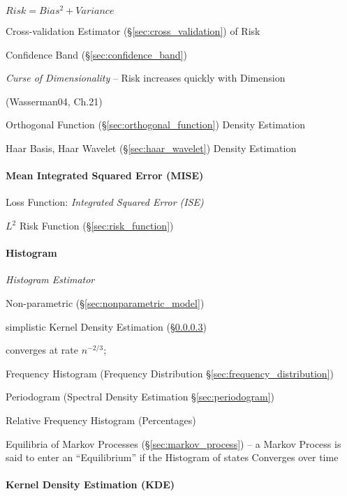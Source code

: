 $Risk = Bias^2 + Variance$

Cross-validation Estimator (\S\ref{sec:cross_validation}) of Risk

Confidence Band (\S\ref{sec:confidence_band})

\emph{Curse of Dimensionality} -- Risk increases quickly with Dimension

(Wasserman04, Ch.21)

Orthogonal Function (\S\ref{sec:orthogonal_function}) Density Estimation

Haar Basis, Haar Wavelet (\S\ref{sec:haar_wavelet}) Density
Estimation



\paragraph{Mean Integrated Squared Error (MISE)}\label{sec:mise}\hfill

Loss Function: \emph{Integrated Squared Error (ISE)}

$L^2$ Risk Function (\S\ref{sec:risk_function})



\paragraph{Histogram}\label{sec:histogram}\hfill

\emph{Histogram Estimator}

Non-parametric (\S\ref{sec:nonparametric_model})

simplistic Kernel Density Estimation (\S\ref{sec:kde})

converges at rate $n^{-2/3}$;

Frequency Histogram (Frequency Distribution \S\ref{sec:frequency_distribution})

\fist Periodogram (Spectral Density Estimation \S\ref{sec:periodogram})

Relative Frequency Histogram (Percentages)

Equilibria of Markov Processes (\S\ref{sec:markov_process}) -- a Markov Process
is said to enter an ``Equilibrium'' if the Histogram of states Converges over
time



\paragraph{Kernel Density Estimation (KDE)}\label{sec:kde}\hfill

